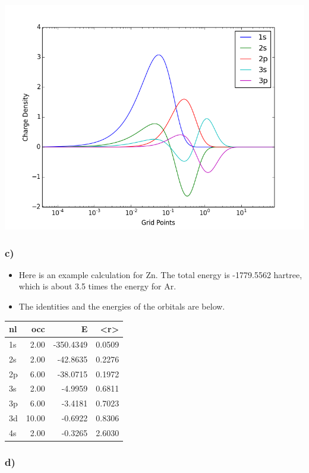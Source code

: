 \documentclass[11pt]{article}
\begin{document}
\includegraphics[width=.9\linewidth]{./images/Ar-orbital-charge-density.png}

\subsubsection{c)}
\label{sec-2-1-3}

\begin{itemize}
\item Here is an example calculation for Zn. The total energy is -1779.5562 hartree, which is about 3.5 times the energy for Ar.

\item The identities and the energies of the orbitals are below.
\end{itemize}

\begin{center}
\begin{tabular}{lrrr}
nl & occ & E & <r>\\
\hline
1s & 2.00 & -350.4349 & 0.0509\\
2s & 2.00 & -42.8635 & 0.2276\\
2p & 6.00 & -38.0715 & 0.1972\\
3s & 2.00 & -4.9959 & 0.6811\\
3p & 6.00 & -3.4181 & 0.7023\\
3d & 10.00 & -0.6922 & 0.8306\\
4s & 2.00 & -0.3265 & 2.6030\\
\end{tabular}
\end{center}


\subsubsection{d)}
\label{sec-2-1-4}
\end{document}
